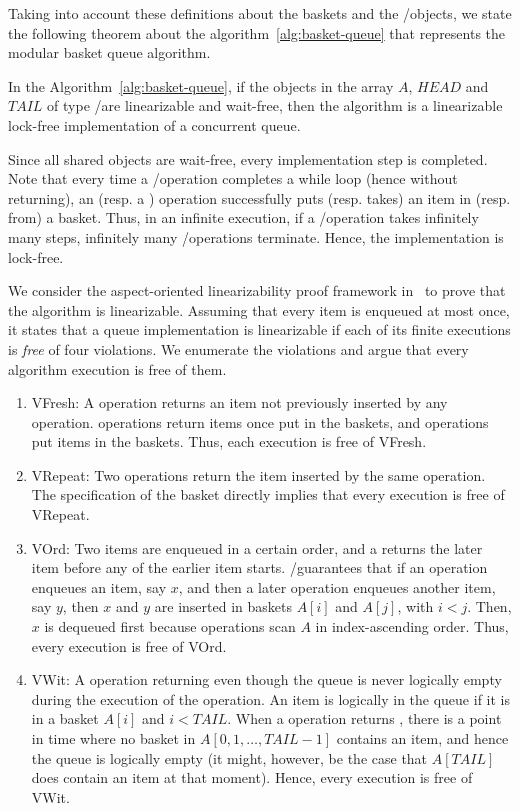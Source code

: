Taking into account these definitions about the baskets and the \LL/\IC objects, we state the following theorem about the algorithm~\ref{alg:basket-queue} that represents the modular basket queue algorithm.

\begin{theorem}\label{theorem:basket-queue}
  In the Algorithm~\ref{alg:basket-queue}, if the objects in the array \(A\), \(HEAD\) and \(TAIL\) of type \LL/\IC are linearizable and wait-free, then the algorithm is a linearizable lock-free implementation of a concurrent queue.
\end{theorem}

\begin{proofT}
  Since all shared objects are wait-free, every implementation step is completed. Note that every time a \Deq/\Enq operation completes a while loop (hence without returning), an \Enq (resp. a \Deq) operation successfully puts (resp. takes) an item in (resp. from) a basket. Thus, in an infinite execution, if a \Deq/\Enq operation takes infinitely many steps, infinitely many \Deq/\Enq operations terminate. Hence, the implementation is lock-free.

  We consider the aspect-oriented linearizability proof framework in~\cite{DBLP_conf_concur_HenzingerSV13} to prove that the algorithm is linearizable. Assuming that every item is enqueued at most once, it states that a queue implementation is linearizable if each of its finite executions is \emph{free} of four violations. We enumerate the violations and argue that every algorithm execution is free of them.

  \begin{enumerate}
      \item VFresh: A \Deq operation returns an item not previously inserted by any \Enq operation.  \Deq operations return items once put in the baskets, and \Enq operations put items in the baskets. Thus, each execution is free of VFresh.
      \item VRepeat: Two \Deq operations return the item inserted by the same \Enq operation. The specification of the basket directly implies that every execution is free of VRepeat.
      \item VOrd: Two items are enqueued in a certain order, and a \Deq returns the later item before any \Deq of the earlier item starts.  \LL/\IC guarantees that if an \Enq operation enqueues an item, say $x$, and then a later \Enq operation enqueues another item, say $y$, then $x$ and $y$ are inserted in baskets $A[i]$ and $A[j]$, with $i < j$. Then, $x$ is dequeued first because \Deq operations scan $A$ in index-ascending order. Thus, every execution is free of VOrd.
      \item VWit: A \Deq operation returning \epty even though the queue is never logically empty during the execution of the \Deq operation. An item is logically in the queue if it is in a basket $A[i]$ and $i < TAIL$. When a \Deq operation returns \epty, there is a point in time where no basket in $A[0, 1, \hdots, TAIL-1]$ contains an item, and hence the queue is logically empty (it might, however, be the case that $A[TAIL]$ does contain an item at that moment). Hence, every execution is free of VWit.
  \end{enumerate}


\end{proofT}

